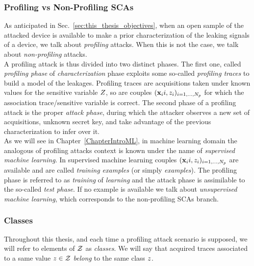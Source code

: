 \subsubsection{Profiling vs Non-Profiling SCAs}
As anticipated in Sec.~\ref{sec:this_thesis_objectives}, when an open sample of the attacked device is available to make a prior characterization of the leaking signals of a device, we talk about \emph{profiling} attacks. When this is not the case, we talk about \emph{non-profiling} attacks. \\
A profiling attack is thus divided into two distinct phases. The first one, called \emph{profiling phase} of \emph{characterization} phase exploits some so-called \emph{profiling traces} to build a model of the leakages. Profiling traces are acquisitions taken under known values for the sensitive variable $Z$, so are couples $(\textbf{x}_{i}{i}, z_i)_{i=1, \dots , N_p}$ for which the association trace/sensitive variable is correct. The second phase of a profiling attack is the proper \emph{attack phase}, during which the attacker observes a new set of acquisitions, unknown secret key, and take advantage of the previous characterization to infer over it. \\
As we will see in Chapter~\ref{ChapterIntroML}, in machine learning domain the analogous of profiling attacks context is known under the name of \emph{supervised machine learning}. In supervised machine learning couples $(\textbf{x}_{i}{i}, z_i)_{i=1, \dots , N_p}$ are available and are called \emph{training examples} (or simply \emph{examples}). The profiling phase is referred to as \emph{training} of \emph{learning} and the attack phase is assimilable to the so-called \emph{test phase}. If no example is available we talk about \emph{unsupervised machine learning}, which corresponds to the non-profiling SCAs branch. 

\subsubsection{Classes}
Throughout this thesis, and each time a profiling attack scenario is supposed,  we will refer to elements of $\mathcal{Z}$ as \emph{classes}. We will say that acquired traces associated to a same value $z\in\mathcal{Z}$ \emph{belong} to the same class $z$.


